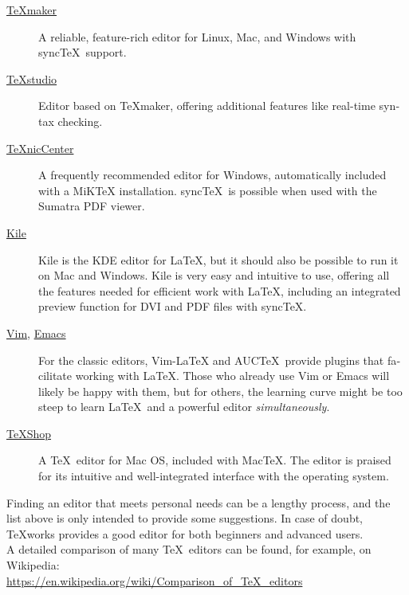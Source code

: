 \documentclass[
	ausgabe=2024-01-13,
	titel=Installation\ Instructions,
	shortverb=true,
	englisch=true,
]{../tex/latexkurs-exercise}
\begin{document}
\begin{english}
\begin{description}
\item[\href{https://www.xm1math.net/texmaker/}{TeXmaker}]
A reliable, feature-rich editor for Linux, Mac, and Windows with sync\TeX\ support.

\item[\href{https://www.texstudio.org/}{TeXstudio}]
Editor based on TeXmaker, offering additional features like real-time syntax checking.

\item[\href{https://www.texniccenter.org/}{TeXnicCenter}]
A frequently recommended editor for Windows, automatically included with a MiKTeX installation. sync\TeX\ is possible when used with the Sumatra PDF viewer.

\item[\href{https://kile.sourceforge.io/}{Kile}]
Kile is the KDE editor for \LaTeX, but it should also be possible to run it on Mac and Windows. Kile is very easy and intuitive to use, offering all the features needed for efficient work with \LaTeX, including an integrated preview function for DVI and PDF files with sync\TeX.

\item[\href{https://www.vim.org/}{Vim}, \href{https://www.gnu.org/software/emacs}{Emacs}]
For the classic editors, Vim-LaTeX and AUC\TeX\ provide plugins that facilitate working with \LaTeX. Those who already use Vim or Emacs will likely be happy with them, but for others, the learning curve might be too steep to learn \LaTeX\ and a powerful editor \emph{simultaneously}.

\item[\href{https://pages.uoregon.edu/koch/texshop}{TeXShop}]
A \TeX\ editor for Mac OS, included with Mac\TeX. The editor is praised for its intuitive and well-integrated interface with the operating system.
\end{description}

\noindent Finding an editor that meets personal needs can be a lengthy process, and the list above is only intended to provide some suggestions. In case of doubt, TeXworks provides a good editor for both beginners and advanced users.\\
A detailed comparison of many \TeX\ editors can be found, for example, on Wikipedia:\\\url{https://en.wikipedia.org/wiki/Comparison_of_TeX_editors}


\end{english}
\end{document}
